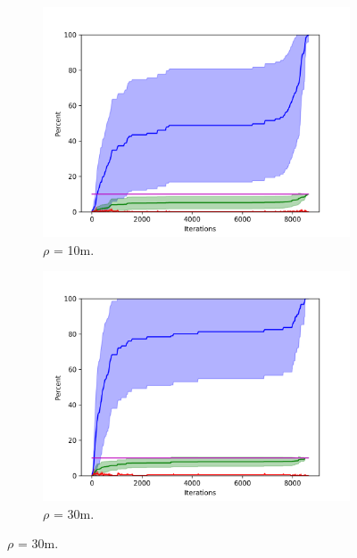 \begin{figure}
\centering

\begin{subfigure}{0.6\textwidth}
\includegraphics[width=\linewidth]{images/plots/Network_rA_10.0/new_plots/10_10.png}
\caption{$\rho$ = 10m.} \label{fig:tarjan0}
\end{subfigure}

\begin{subfigure}{0.6\textwidth}
\includegraphics[width=\linewidth]{images/plots/Network_rA_10.0/new_plots/30_10.png}
\caption{$\rho$ = 30m.} \label{fig:tarjan0}
\end{subfigure}


\end{figure}
